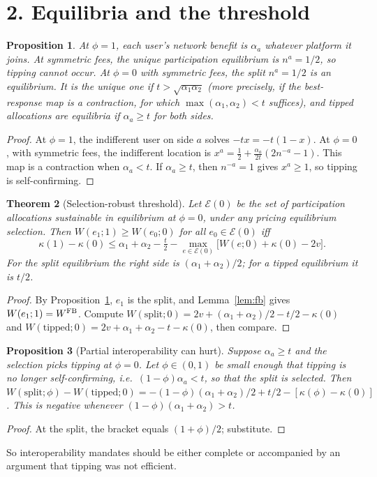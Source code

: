 \documentclass[11pt]{article}
\newtheorem{theorem}{Theorem}
\newtheorem{proposition}[theorem]{Proposition}
\theoremstyle{definition}
\begin{document}
\section*{2. Equilibria and the threshold}
\begin{proposition}\label{prop:eq}
At $\phi=1$, each user's network benefit is $\alpha_a$ whatever platform it joins. At symmetric fees, the unique
participation equilibrium is $n^a=1/2$, so tipping cannot occur. At $\phi=0$ with symmetric fees, the split $n^a=1/2$ is
an equilibrium. It is the unique one if $t>\sqrt{\alpha_1\alpha_2}$ (more precisely, if the best-response map is a
contraction, for which $\max(\alpha_1,\alpha_2)<t$ suffices), and tipped allocations are equilibria if
$\alpha_a\ge t$ for both sides.
\end{proposition}
\begin{proof}
At $\phi=1$, the indifferent user on side $a$ solves $-tx=-t(1-x)$. At $\phi=0$, with symmetric fees, the indifferent
location is $x^a=\tfrac12+\tfrac{\alpha_a}{2t}(2n^{-a}-1)$. This map is a contraction when $\alpha_a<t$. If $\alpha_a\ge t$,
then $n^{-a}=1$ gives $x^a\ge1$, so tipping is self-confirming.
\end{proof}
\begin{theorem}[Selection-robust threshold]\label{thm:thr}
Let $\mathcal E(0)$ be the set of participation allocations sustainable in equilibrium at $\phi=0$, under any pricing
equilibrium selection. Then $W(e_1;1)\ge W(e_0;0)$ for all $e_0\in\mathcal E(0)$ iff
\[
 \kappa(1)-\kappa(0)\le\alpha_1+\alpha_2-\tfrac t2-\max_{e\in\mathcal E(0)}\bigl[W(e;0)+\kappa(0)-2v\bigr].
\]
For the split equilibrium the right side is $(\alpha_1+\alpha_2)/2$; for a tipped equilibrium it is $t/2$.
\end{theorem}
\begin{proof}
By Proposition~\ref{prop:eq}, $e_1$ is the split, and Lemma~\ref{lem:fb} gives $W(e_1;1)=W^{\rm FB}$. Compute
$W(\text{split};0)=2v+(\alpha_1+\alpha_2)/2-t/2-\kappa(0)$ and $W(\text{tipped};0)=2v+\alpha_1+\alpha_2-t-\kappa(0)$, then
compare.
\end{proof}
\begin{proposition}[Partial interoperability can hurt]\label{prop:partial}
Suppose $\alpha_a\ge t$ and the selection picks tipping at $\phi=0$. Let $\phi\in(0,1)$ be small enough that tipping is no
longer self-confirming, i.e.\ $(1-\phi)\alpha_a<t$, so that the split is selected. Then
$W(\text{split};\phi)-W(\text{tipped};0)=-(1-\phi)(\alpha_1+\alpha_2)/2+t/2-[\kappa(\phi)-\kappa(0)]$. This is negative
whenever $(1-\phi)(\alpha_1+\alpha_2)>t$.
\end{proposition}
\begin{proof}
At the split, the bracket equals $(1+\phi)/2$; substitute.
\end{proof}
So interoperability mandates should be either complete or accompanied by an argument that tipping was not efficient.
\end{document}
